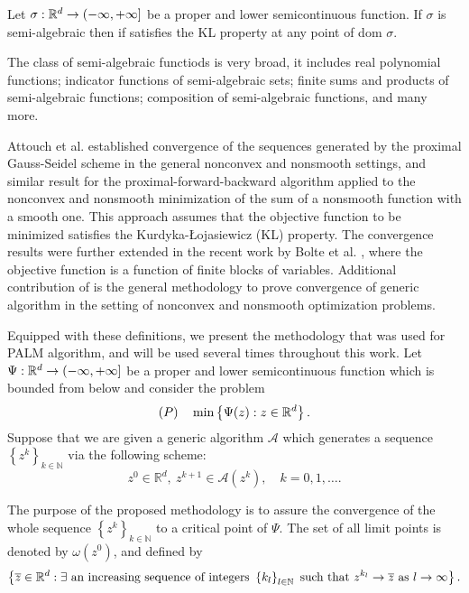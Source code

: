 \begin{theorem} \label{SA_is_KL}
Let $\sigma:\mathbb{R}^d \rightarrow (-\infty, +\infty]$ be a proper and lower semicontinuous function. If $\sigma$ is semi-algebraic then if satisfies the KL property at any point of dom $\sigma$.
\end{theorem}
The class of semi-algebraic functiods is very broad, it includes real polynomial functions; indicator functions of semi-algebraic sets; finite sums and products of semi-algebraic functions; composition of semi-algebraic functions, and many more.

Attouch et al. \cite{AB2009, ABS2013} established convergence of the sequences generated by the proximal Gauss-Seidel scheme in the general nonconvex and nonsmooth settings, and similar result for the proximal-forward-backward algorithm applied to the nonconvex and nonsmooth minimization of the sum of a nonsmooth function with a smooth one. This approach assumes that the objective function to be minimized satisfies the Kurdyka-{\L}ojasiewicz (KL) property. The convergence results were further extended in the recent work by Bolte et al. \cite{BST2014}, where the objective function is a function of finite blocks of variables. Additional contribution of \cite{BST2014} is the general methodology to prove convergence of generic algorithm in the setting of nonconvex and nonsmooth optimization problems.

Equipped with these definitions, we present the methodology that was used for PALM algorithm, and will be used several times throughout this work. Let $\Psi : \mathbb{R}^d \rightarrow ( -\infty, +\infty ]$ be a proper and lower semicontinuous function which is bounded from below and consider the problem
\begin{equation*}
	(P) \quad \min \left\lbrace \Psi(z) : z \in \mathbb{R}^d \right\rbrace .
\end{equation*} 
Suppose that we are given a generic algorithm $\mathcal{A}$ which generates a sequence $\left\lbrace z^k \right\rbrace_{k \in \mathbb{N}}$ via the following scheme:
\begin{equation*}
	z^0 \in \mathbb{R}^d, \: z^{k+1} \in \mathcal{A}\left(z^k\right), \quad k=0,1,\ldots.
\end{equation*}

The purpose of the proposed methodology is to assure the convergence of the whole sequence $\left\lbrace z^k \right\rbrace_{k \in \mathbb{N}}$ to a critical point of $\Psi$. The set of all limit points is denoted by $\omega\left(z^0\right)$, and defined by
\begin{equation*}
	\left\lbrace \overline{z} \in \mathbb{R}^d : \exists \text{ an increasing sequence of integers } \left\lbrace k_l\right\rbrace_{l \in \mathbb{N}} \text{ such that } z^{k_l} \rightarrow \overline{z} \text{ as } l \rightarrow \infty \right\rbrace .
\end{equation*}

